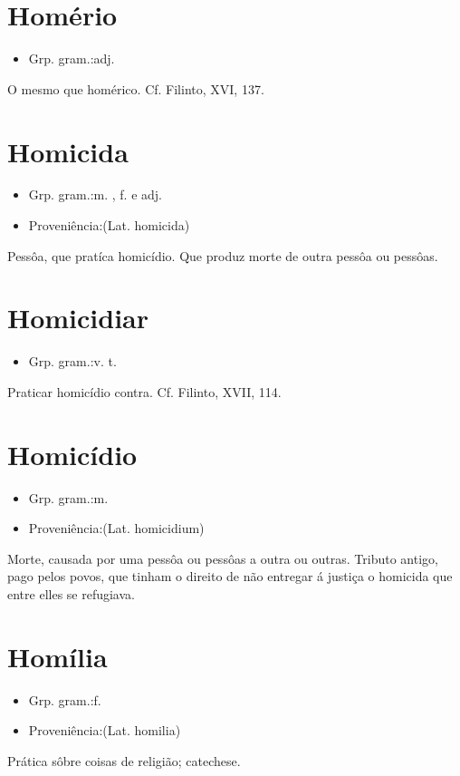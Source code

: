 \documentclass{article}
\begin{document}
\section{Homério}
\begin{itemize}
\item {Grp. gram.:adj.}
\end{itemize}
O mesmo que \textunderscore homérico\textunderscore . Cf. Filinto, XVI, 137.
\section{Homicida}
\begin{itemize}
\item {Grp. gram.:m. ,  f.  e  adj.}
\end{itemize}
\begin{itemize}
\item {Proveniência:(Lat. \textunderscore homicida\textunderscore )}
\end{itemize}
Pessôa, que pratíca homicídio.
Que produz morte de outra pessôa ou pessôas.
\section{Homicidiar}
\begin{itemize}
\item {Grp. gram.:v. t.}
\end{itemize}
Praticar homicídio contra. Cf. Filinto, XVII, 114.
\section{Homicídio}
\begin{itemize}
\item {Grp. gram.:m.}
\end{itemize}
\begin{itemize}
\item {Proveniência:(Lat. \textunderscore homicidium\textunderscore )}
\end{itemize}
Morte, causada por uma pessôa ou pessôas a outra ou outras.
Tributo antigo, pago pelos povos, que tinham o direito de não entregar á justiça o homicida que entre elles se refugiava.
\section{Homília}
\begin{itemize}
\item {Grp. gram.:f.}
\end{itemize}
\begin{itemize}
\item {Proveniência:(Lat. \textunderscore homilia\textunderscore )}
\end{itemize}
Prática sôbre coisas de religião; catechese.
\end{document}
